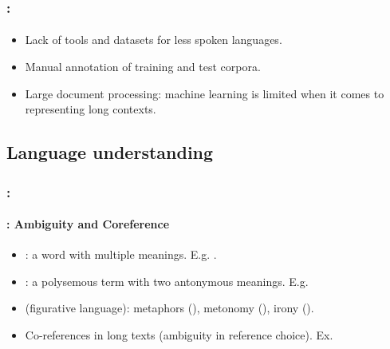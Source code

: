 \documentclass[xcolor=table]{beamer}
\begin{document}
\begin{frame}
	\frametitle{\insertshortsubtitle: \insertsection}
	\framesubtitle{\insertsubsection}

	\begin{itemize}
		\item Lack of tools and datasets for less spoken languages.
		\item Manual annotation of training and test corpora.
		\item Large document processing: machine learning is limited when it comes to representing long contexts.
	\end{itemize}

\end{frame}

\subsection{Language understanding}

\begin{frame}
	\frametitle{\insertshortsubtitle: \insertsection}
	\framesubtitle{\insertsubsection: Ambiguity and Coreference}

	\begin{itemize}
		\item {}: a word with multiple meanings.
		E.g. .
		\item {}: a polysemous term with two antonymous meanings.
		E.g. 
		\item {} (figurative language): metaphors (), metonomy (), irony ().
		\item Co-references in long texts (ambiguity in reference choice).
		Ex. 
	\end{itemize}

\end{frame}
\end{document}
